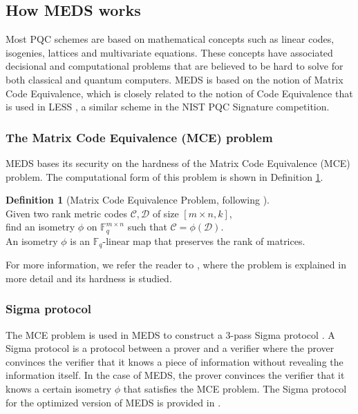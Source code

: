 \documentclass[11pt,a4paper]{report}
\theoremstyle{definition}
\newtheorem{definition}{Definition}[section]
\begin{document}
\subsection{How MEDS works}
\label{sec:medsworks}
Most PQC schemes are based on mathematical concepts such as linear codes, isogenies, lattices and multivariate equations. These concepts have associated decisional and computational problems that are believed to be hard to solve for both classical and quantum computers. MEDS is based on the notion of Matrix Code Equivalence, which is closely related to the notion of Code Equivalence that is used in LESS \cite{biasse2020less}, a similar scheme in the NIST PQC Signature competition.

\subsubsection{The Matrix Code Equivalence (MCE) problem}
MEDS bases its security on the hardness of the Matrix Code Equivalence (MCE) problem. The computational form of this problem is shown in Definition \ref{def:mceproblem}.

\begin{definition}[Matrix Code Equivalence Problem, following \cite{chou2023meds}]~\\
  \label{def:mceproblem}
  Given two rank metric codes $\mathcal{C}, \mathcal{D}$ of size $[m \times n, k]$,\\
  find an isometry $\phi$ on $\mathbb{F}_q^{m \times n}$ such that $\mathcal{C} = \phi(\mathcal{D})$.\\
  An isometry $\phi$ is an $\mathbb{F}_q$-linear map that preserves the rank of matrices. 
\end{definition}

For more information, we refer the reader to \cite{reijnders2024hardness}, where the problem is explained in more detail and its hardness is studied.

\subsubsection{Sigma protocol}
\label{sec:sigmaprotocol}
The MCE problem is used in MEDS to construct a 3-pass Sigma protocol \cite{damgaard2002sigma}. A Sigma protocol is a protocol between a prover and a verifier where the prover convinces the verifier that it knows a piece of information without revealing the information itself. In the case of MEDS, the prover convinces the verifier that it knows a certain isometry $\phi$ that satisfies the MCE problem. The Sigma protocol for the optimized version of MEDS is provided in \cite[Section 4.2]{chou2024reducing}.
\end{document}
